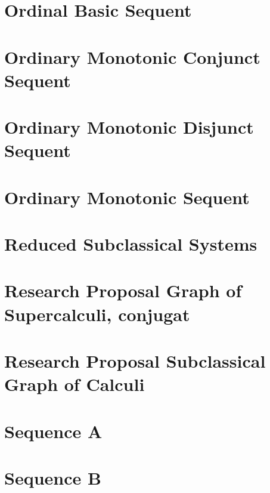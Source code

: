 \documentclass{report}
\begin{document}
\chapter{Ordinal Basic Sequent}


\chapter{Ordinary Monotonic Conjunct Sequent}


\chapter{Ordinary Monotonic Disjunct Sequent}


\chapter{Ordinary Monotonic Sequent}


\chapter{Reduced Subclassical Systems}


\chapter{Research Proposal Graph of Supercalculi, conjugat}


\chapter{Research Proposal Subclassical Graph of Calculi}


\chapter{Sequence A}


\chapter{Sequence B}

\end{document}
